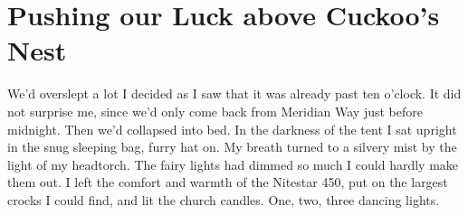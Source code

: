\section{Pushing our Luck above Cuckoo's Nest}
\begin{marginfigure}
\end{marginfigure}
We'd overslept a lot I decided as I saw that it was already past ten o'clock. It did not surprise me, since we'd only come back from Meridian Way just before midnight. Then we'd collapsed into bed.
 In the darkness of the tent I sat upright in the snug sleeping bag, furry hat on. My breath turned to a silvery mist by the light of my headtorch. The fairy lights had dimmed so much I could hardly make them out. I left the comfort and warmth of the Nitestar 450, put on the largest crocks I could find, and lit the church candles. One, two, three dancing lights. 
 
